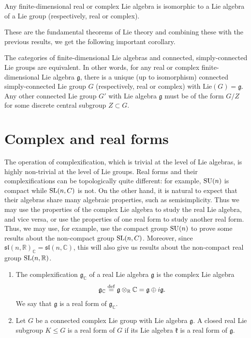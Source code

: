 \documentclass{report}
\begin{document}
\begin{theorem}
Any finite-dimensional real or complex Lie algebra is isomorphic to a Lie algebra of a Lie group (respectively, real or complex).
\end{theorem}

These are the fundamental theorems of Lie theory and combining these with the previous results, we get the following important corollary.

\begin{corollary}
    The categories of finite-dimensional Lie algebras and connected, simply-connected Lie groups are equivalent.
    In other words, for any real or complex finite-dimensional Lie algebra $\mathfrak{g}$, there is a unique (up to isomorphism) connected simply-connected Lie group $G$ (respectively, real or complex) with $\text{Lie}(G) = \mathfrak{g}$. Any other connected Lie group $G'$ with Lie algebra $\mathfrak{g}$ must be of the form $G/Z$ for some discrete central subgroup $Z \subset G$.
\end{corollary}

\section{Complex and real forms}
The operation of complexiﬁcation, which is trivial at the level of Lie algebras,
is highly non-trivial at the level of Lie groups.
Real forms and their complexifications can be topologically quite different: for example, $\operatorname{{\mathrm{SU}}}(n)$ is compact while $\operatorname{{\mathrm{SL}}}(n, C)$ is not. On the other hand, it is natural to expect that their algebras share many algebraic properties, such as semisimplicity.
Thus we may use the properties of the complex Lie algebra to study the real Lie algebra, and vice versa, or use the properties of one real form to study another real form.
Thus, we may use, for example, use the compact group $\operatorname{{\mathrm{SU}}}(n)$ to prove some results
about the non-compact group $\operatorname{{\mathrm{SL}}}(n, C)$. Moreover, since $\mathfrak{sl}(n, \mathbb R)_{\mathbb C} = \mathfrak{sl}(n, \mathbb C)$,
this will also give us results about the non-compact real group $\operatorname{{\mathrm{SL}}}(n, \mathbb R)$.

\begin{definition}
    \begin{enumerate}[label = (\roman*)]
        \item 
        The complexification $\mathfrak g_{\mathbb C}$ of a real Lie algebra $\mathfrak g$ is the complex Lie algebra
    \[
    \mathfrak g_{\mathbb C} \overset{\mathrm{def}}{=} \mathfrak g \otimes_{\mathbb R} \mathbb C = \mathfrak g \oplus i \mathfrak g.
    \]
    We say that $\mathfrak g$ is a real form of $\mathfrak g_{\mathbb C}$.
    \item
    Let $G$ be a connected complex Lie group with Lie algebra $\mathfrak g$. 
    A closed real Lie subgroup $K \leq G$ is a real form of $G$ if its Lie algebra $\mathfrak k$ is a real form of $\mathfrak g$.
    \end{enumerate}
\end{definition}
\end{document}
